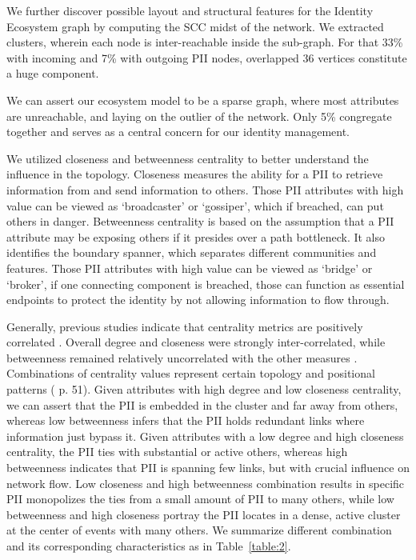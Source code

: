 \documentclass[conference]{IEEEtran}
\begin{document}
We further discover possible layout and structural features for the Identity Ecosystem graph by computing the SCC midst of the network. We extracted clusters, wherein each node is inter-reachable inside the sub-graph. For that 33\% with incoming and 7\% with outgoing PII nodes, overlapped 36 vertices constitute a huge component. 

We can assert our ecosystem model to be a sparse graph, where most attributes are unreachable, and laying on the outlier of the network. Only 5\% congregate together and serves as a central concern for our identity management.

We utilized closeness and betweenness centrality to better understand the influence in the topology.  Closeness measures the ability for a PII to retrieve information from and send information to others. Those PII attributes with high value can be viewed as `broadcaster' or `gossiper', which if breached, can put others in danger. Betweenness centrality is based on the assumption that a PII attribute may be exposing others if it presides over a path bottleneck. It also identifies the boundary spanner, which separates different communities and features. Those PII attributes with high value can be viewed as `bridge' or `broker', if one connecting component is breached, those can function as essential endpoints to protect the identity by not allowing information to flow through. 

Generally, previous studies indicate that centrality metrics are positively correlated \cite{Correlated} \cite{CorrelationCoefficient}. 
Overall degree and closeness were strongly inter-correlated, while betweenness remained relatively uncorrelated with the other measures \cite{Bolland}. Combinations of centrality values represent certain topology and positional patterns (\cite{Donglei} p. 51). Given attributes with high degree and low closeness centrality, we can assert that the PII is embedded in the cluster and far away from others, whereas low betweenness infers that the PII holds redundant links where information just bypass it. Given attributes with a low degree and high closeness centrality, the PII ties with substantial or active others, whereas high betweenness indicates that PII is spanning few links, but with crucial influence on network flow. Low closeness and high betweenness combination results in specific PII monopolizes the ties from a small amount of PII to many others, while low betweenness and high closeness portray the PII locates in a dense, active cluster at the center of events with many others. We summarize different combination and its corresponding characteristics as in Table~\ref{table:2}.
\end{document}
